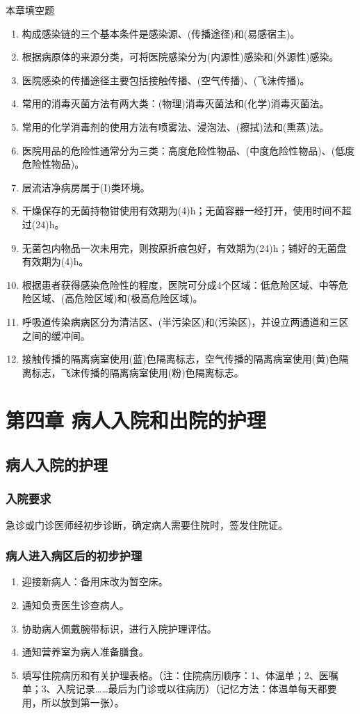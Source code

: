 \documentclass[11pt, a4paper]{ctexart}
\begin{document}
\begin{tipsbox}{本章填空题}
\begin{enumerate}
    \item 构成感染链的三个基本条件是感染源、(传播途径)和(易感宿主)。
    \item 根据病原体的来源分类，可将医院感染分为(内源性)感染和(外源性)感染。
    \item 医院感染的传播途径主要包括接触传播、(空气传播)、(飞沫传播)。
    \item 常用的消毒灭菌方法有两大类：(物理)消毒灭菌法和(化学)消毒灭菌法。
    \item 常用的化学消毒剂的使用方法有喷雾法、浸泡法、(擦拭)法和(熏蒸)法。
    \item 医院用品的危险性通常分为三类：高度危险性物品、(中度危险性物品)、(低度危险性物品)。
    \item 层流洁净病房属于(I)类环境。
    \item 干燥保存的无菌持物钳使用有效期为(4)h；无菌容器一经打开，使用时间不超过(24)h。
    \item 无菌包内物品一次未用完，则按原折痕包好，有效期为(24)h；铺好的无菌盘有效期为(4)h。
    \item 根据患者获得感染危险性的程度，医院可分成4个区域：低危险区域、中等危险区域、(高危险区域)和(极高危险区域)。
    \item 呼吸道传染病病区分为清洁区、(半污染区)和(污染区)，并设立两通道和三区之间的缓冲间。
    \item 接触传播的隔离病室使用(蓝)色隔离标志，空气传播的隔离病室使用(黄)色隔离标志，飞沫传播的隔离病室使用(粉)色隔离标志。
\end{enumerate}
\end{tipsbox}

\section{第四章 病人入院和出院的护理}
\subsection{病人入院的护理}
\subsubsection{入院要求}
急诊或门诊医师经初步诊断，确定病人需要住院时，签发住院证。

\subsubsection{病人进入病区后的初步护理}
\begin{enumerate}
    \item 迎接新病人：备用床改为暂空床。
    \item 通知负责医生诊查病人。
    \item 协助病人佩戴腕带标识，进行入院护理评估。
    \item 通知营养室为病人准备膳食。
    \item 填写住院病历和有关护理表格。（注：住院病历顺序：1、体温单；2、医嘱单；3、入院记录……最后为门诊或以往病历）（记忆方法：体温单每天都要用，所以放到第一张）。
\end{enumerate}
\end{document}
